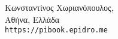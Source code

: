 \vfill

Κωνσταντίνος Χωριανόπουλος, \\
Αθήνα, Ελλάδα \\
\texttt{https://pibook.epidro.me}

\vspace*{2\baselineskip}


\endgroup
